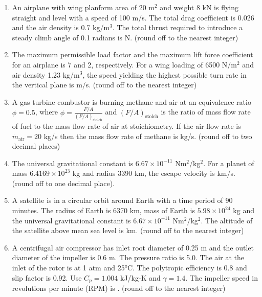 \documentclass{article}
\begin{document}
\begin{enumerate}[leftmargin=*, resume]
\item An airplane with wing planform area of 20 m$^2$ and weight 8 kN is flying straight and level with a speed of 100 m/s. The total drag coefficient is 0.026 and the air density is 0.7 kg/m$^3$. The total thrust required to introduce a steady climb angle of 0.1 radians is \underline{\hspace{1.5cm}} N. (round off to the nearest integer)

\item The maximum permissible load factor and the maximum lift force coefficient for an airplane is 7 and 2, respectively. For a wing loading of 6500 N/m$^2$ and air density 1.23 kg/m$^3$, the speed yielding the highest possible turn rate in the vertical plane is \underline{\hspace{1.5cm}} m/s. (round off to the nearest integer)

\item A gas turbine combustor is burning methane and air at an equivalence ratio $\phi = 0.5$, where $\phi = \frac{F/A}{(F/A)_{\text{stolch}}}$ and $(F/A)_{\text{stolch}}$ is the ratio of mass flow rate of fuel to the mass flow rate of air at stoichiometry. If the air flow rate is $\dot{m}_{\text{air}} = 20$ kg/s then the mass flow rate of methane is \underline{\hspace{1.5cm}} kg/s. (round off to two decimal places)

\item The universal gravitational constant is $6.67 \times 10^{-11}$ Nm$^2$/kg$^2$. For a planet of mass $6.4169 \times 10^{23}$ kg and radius 3390 km, the escape velocity is \underline{\hspace{1.5cm}} km/s. (round off to one decimal place).

\item A satellite is in a circular orbit around Earth with a time period of 90 minutes. The radius of Earth is 6370 km, mass of Earth is $5.98 \times 10^{24}$ kg and the universal gravitational constant is $6.67 \times 10^{-11}$ Nm$^2$/kg$^2$. The altitude of the satellite above mean sea level is \underline{\hspace{1.5cm}} km. (round off to the nearest integer)

\item A centrifugal air compressor has inlet root diameter of 0.25 m and the outlet diameter of the impeller is 0.6 m. The pressure ratio is 5.0. The air at the inlet of the rotor is at 1 atm and 25°C. The polytropic efficiency is 0.8 and slip factor is 0.92. Use $C_p = 1.004$ kJ/kg-K and $\gamma = 1.4$. The impeller speed in revolutions per minute (RPM) is \underline{\hspace{1.5cm}}. (round off to the nearest integer)


\end{enumerate}
\end{document}
